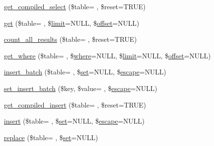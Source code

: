 \begin{DoxyCompactItemize}
\hyperlink{class_c_i___d_b__query__builder_ad02ec84bdb2bc9019a29baf0f27eb6bc}{get\+\_\+compiled\+\_\+select} (\$table= \textquotesingle{}\textquotesingle{}, \$reset=T\+R\+U\+E)
\item 
\hyperlink{class_c_i___d_b__query__builder_a9e31f9f0d21d026e3e58b8225b79b8c1}{get} (\$table= \textquotesingle{}\textquotesingle{}, \$\hyperlink{class_c_i___d_b__query__builder_a875b0d4703f176c36e771d728a9a04a0}{limit}=N\+U\+L\+L, \$\hyperlink{class_c_i___d_b__query__builder_afd31b65425a2b5cf30711bf29e1b1851}{offset}=N\+U\+L\+L)
\item 
\hyperlink{class_c_i___d_b__query__builder_a682ce62db0b118f0803df661c82d4fd8}{count\+\_\+all\+\_\+results} (\$table= \textquotesingle{}\textquotesingle{}, \$reset=T\+R\+U\+E)
\item 
\hyperlink{class_c_i___d_b__query__builder_a7b120c9cf6f8aac4b82750bf8f7c9f17}{get\+\_\+where} (\$table= \textquotesingle{}\textquotesingle{}, \$\hyperlink{class_c_i___d_b__query__builder_a2356c4b7b93fb83c62a354a8a0748222}{where}=N\+U\+L\+L, \$\hyperlink{class_c_i___d_b__query__builder_a875b0d4703f176c36e771d728a9a04a0}{limit}=N\+U\+L\+L, \$\hyperlink{class_c_i___d_b__query__builder_afd31b65425a2b5cf30711bf29e1b1851}{offset}=N\+U\+L\+L)
\item 
\hyperlink{class_c_i___d_b__query__builder_a1cee06687b1da4d58959993bdd69c9c2}{insert\+\_\+batch} (\$table= \textquotesingle{}\textquotesingle{}, \$\hyperlink{class_c_i___d_b__query__builder_ad24529c8e6cd4e3f58c0a3e55815b532}{set}=N\+U\+L\+L, \$\hyperlink{class_c_i___d_b__driver_ac8f37ca5703d4558c732e692194f8cd6}{escape}=N\+U\+L\+L)
\item 
\hyperlink{class_c_i___d_b__query__builder_a373d04f66d9bf73c7aceb1a925697a54}{set\+\_\+insert\+\_\+batch} (\$key, \$value= \textquotesingle{}\textquotesingle{}, \$\hyperlink{class_c_i___d_b__driver_ac8f37ca5703d4558c732e692194f8cd6}{escape}=N\+U\+L\+L)
\item 
\hyperlink{class_c_i___d_b__query__builder_ab24af8f4b84f989cc09aa7c82e9c9721}{get\+\_\+compiled\+\_\+insert} (\$table= \textquotesingle{}\textquotesingle{}, \$reset=T\+R\+U\+E)
\item 
\hyperlink{class_c_i___d_b__query__builder_a7913ac1869e54b240f10ca866cee1878}{insert} (\$table= \textquotesingle{}\textquotesingle{}, \$\hyperlink{class_c_i___d_b__query__builder_ad24529c8e6cd4e3f58c0a3e55815b532}{set}=N\+U\+L\+L, \$\hyperlink{class_c_i___d_b__driver_ac8f37ca5703d4558c732e692194f8cd6}{escape}=N\+U\+L\+L)
\item 
\hyperlink{class_c_i___d_b__query__builder_a71a4809228dce3974013c0db36a5f281}{replace} (\$table= \textquotesingle{}\textquotesingle{}, \$\hyperlink{class_c_i___d_b__query__builder_ad24529c8e6cd4e3f58c0a3e55815b532}{set}=N\+U\+L\+L)

\end{DoxyCompactItemize}
